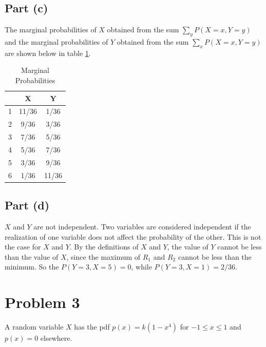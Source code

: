 \documentclass[11pt]{article}
\begin{document}
\subsection*{Part (c)}
The marginal probabilities of $X$ obtained from the sum $\sum_yP(X=x,Y=y)$
and the marginal probabilities of $Y$ obtained from the sum $\sum_xP(X=x,Y=y)$ are shown below in table \ref{marginals}.
\begin{table}[h!]
  \begin{center}
    \caption{Marginal Probabilities}
    \label{marginals}
    \begin{tabular}{c|c|c} %
       & X & Y \\
      \hline
      1 & 11/36 & 1/36 \\
      2 & 9/36 & 3/36 \\
      3 & 7/36 & 5/36 \\
      4 & 5/36 & 7/36 \\
      5 & 3/36 & 9/36 \\
      6 & 1/36 & 11/36 \\
    \end{tabular}
  \end{center}
\end{table}

\subsection*{Part (d)}
$X$ and $Y$ are not independent. Two variables are considered independent if the realization of one variable does not affect the probability of the other. This is not the case for $X$ and $Y$. By the definitions of $X$ and $Y$, the value of $Y$ cannot be less than the value of $X$, since the maximum of $R_1$ and $R_2$ cannot be less than the minimum. So the $P(Y=3,X=5)=0$, while $P(Y=3,X=1) = 2/36$.

\section*{Problem 3}
A random variable $X$ has the pdf $p(x)=k(1-x^4)$ for $-1\leq x\leq1$ and $p(x)=0$ elsewhere.
\end{document}
